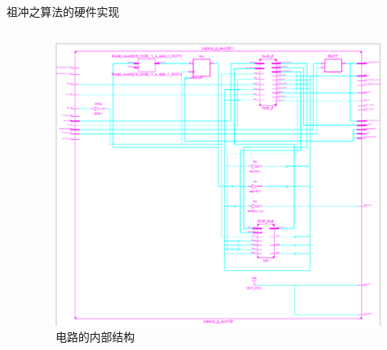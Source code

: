 \documentclass{beamer}
\begin{document}
\begin{frame}{祖冲之算法的硬件实现}
\begin{columns}
\begin{column}{0.4\textwidth}
    \end{column}
    \begin{column}{0.6\textwidth}
        \begin{figure}[htbp]
            \includegraphics[height=0.6\textheight]{./images/circuit_more.png}
            \caption*{电路的内部结构}
        \end{figure}
    \end{column}
\end{columns}
\end{frame}
\end{document}
